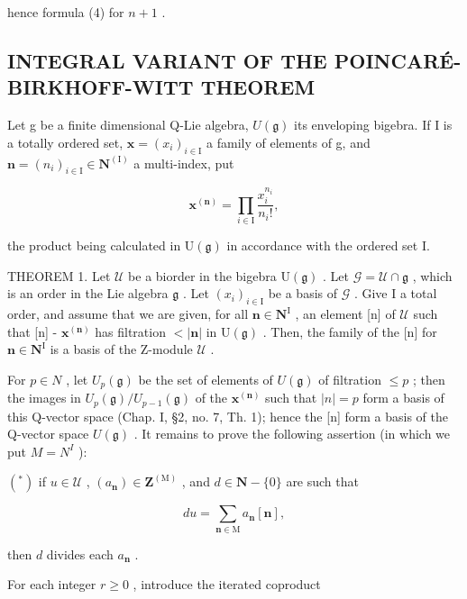 hence formula (4) for \(n + 1\) .

\subsection{INTEGRAL VARIANT OF THE POINCAR\'E-BIRKHOFF-WITT THEOREM}

Let g be a finite dimensional Q-Lie algebra, \(U(\mathfrak{g})\) its enveloping bigebra. If I is a totally ordered set, \(\mathbf{x} = (x_i)_{i \in \mathrm{I}}\) a family of elements of g, and \(\mathbf{n} = (n_i)_{i \in \mathrm{I}} \in \mathbf{N}^{(\mathrm{I})}\) a multi-index, put

\[
\mathbf {x} ^ {(\mathbf {n})} = \prod_ {i \in \mathrm{I}} \frac {x _ {i} ^ {n _ {i}}}{n _ {i} !},\tag{5}
\]

the product being calculated in \(\mathrm{U}(\mathfrak{g})\) in accordance with the ordered set I.

THEOREM 1. Let \(\mathcal{U}\) be a biorder in the bigebra \(\mathrm{U}(\mathfrak{g})\) . Let \(\mathcal{G} = \mathcal{U} \cap \mathfrak{g}\) , which is an order in the Lie algebra \(\mathfrak{g}\) . Let \((x_i)_{i \in \mathrm{I}}\) be a basis of \(\mathcal{G}\) . Give I a total order, and assume that we are given, for all \(\mathbf{n} \in \mathbf{N}^{\mathrm{I}}\) , an element {[}n{]} of \(\mathcal{U}\) such that {[}n{]} - \(\mathbf{x}^{(\mathbf{n})}\) has filtration \(< |\mathbf{n}|\) in \(\mathrm{U}(\mathfrak{g})\) . Then, the family of the {[}n{]} for \(\mathbf{n} \in \mathbf{N}^{\mathrm{I}}\) is a basis of the Z-module \(\mathcal{U}\) .

For \(p \in N\) , let \(U_{p}(\mathfrak{g})\) be the set of elements of \(U(\mathfrak{g})\) of filtration \(\leq p\) ; then the images in \(U_{p}(\mathfrak{g}) / U_{p-1}(\mathfrak{g})\) of the \(\mathbf{x}^{(\mathbf{n})}\) such that \(|n| = p\) form a basis of this Q-vector space (Chap. I, §2, no. 7, Th. 1); hence the {[}n{]} form a basis of the Q-vector space \(U(\mathfrak{g})\) . It remains to prove the following assertion (in which we put \(M = N^{I}\) ):

\((^{*})\) if \(u\in \mathcal{U}\) , \((a_{\mathbf{n}})\in \mathbf{Z}^{(\mathrm{M})}\) , and \(d\in \mathbf{N} - \{0\}\) are such that

\[
d u = \sum_ {\mathbf {n} \in \mathrm{M}} a _ {\mathbf {n}} [ \mathbf {n} ],\tag{6}
\]

then \(d\) divides each \(a_{\mathbf{n}}\) .

For each integer \(r \geq 0\) , introduce the iterated coproduct

